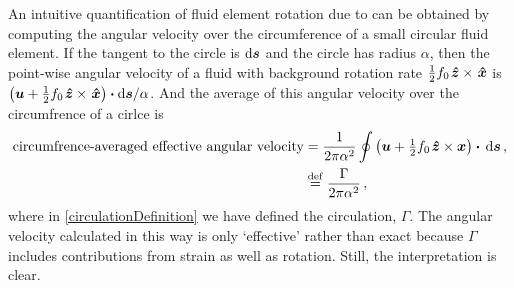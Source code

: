 \documentclass[12pt, oneside]{book}
\begin{document}
An intuitive quantification of fluid element rotation due to \cite{batchelor2000introduction} can be obtained by computing the angular velocity over the circumference of a small circular fluid element.  If the tangent to the circle is ${\rm d} \boldsymbol{s}$ and the circle has radius $\alpha$, then the point-wise angular velocity of a fluid with background rotation rate $\tfrac{1}{2} f_0 \hspace{0.1em}\boldsymbol{\hat z} \times \hspace{0.1em} \boldsymbol{\hat x}$ is $\left ( \boldsymbol u + \tfrac{1}{2} f_0 \hspace{0.1em}\boldsymbol{\hat z} \times \hspace{0.1em} \boldsymbol{\hat x} \right ) \boldsymbol \cdot {\rm d} \boldsymbol{s} / \alpha$.  And the average of this angular velocity over the circumfrence of a cirlce is
\begin{align}
 \text{circumfrence-averaged effective angular velocity} &= \frac{1}{2 \pi \alpha^2} \oint \left ( \boldsymbol u + \tfrac{1}{2} f_0 \hspace{0.1em}\boldsymbol{\hat z} \times \boldsymbol x \right ) \boldsymbol \cdot {\, \rm d} \boldsymbol{s} \, , \\
&\stackrel{\mathrm{def}}{=} \frac{\Gamma}{2 \pi \alpha^2} \, , \label{circulationDefinition}
\end{align}
where in \eqref{circulationDefinition} we have defined the circulation, $\Gamma$.  The angular velocity calculated in this way is only `effective' rather than exact because $\Gamma$ includes contributions from strain as well as rotation.  Still, the interpretation is clear.
\end{document}
